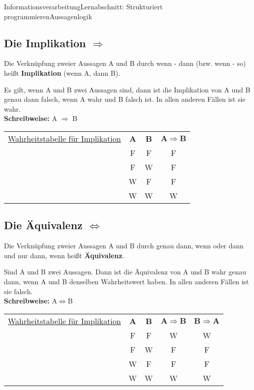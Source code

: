 \documentclass[11pt,oneside,openany,headings=optiontotoc,11pt,numbers=noenddot]{article}
\begin{document}
\begin{worksheet}{Informationsverarbeitung}{Lernabschnitt: Strukturiert programmieren}{Aussagenlogik}
		\subsection{Die Implikation \grqq{}$\Rightarrow$\grqq{}}
		Die Verknüpfung zweier Aussagen A und B durch \grqq{}wenn - dann\grqq{} (bzw. \grqq{}wenn - so\grqq{}) heißt \textbf{Implikation} (wenn A, dann B).
		\begin{framed}
			\noindent
			Es gilt, wenn A und B zwei Aussagen sind, dann ist die Implikation von A und B genau dann falsch, wenn A wahr und B falsch ist. In allen anderen Fällen ist sie wahr.\\
			\textbf{Schreibweise:} A $\Rightarrow$ B
		\end{framed}
		\par\noindent
		\begin{tabularx}{\textwidth}{l|c|c|c|}
			\cline{2-4}
			\underline{Wahrheitstabelle für Implikation} & \textbf{A} & \textbf{B} & \(\mathbf{A \Rightarrow{}B}\)\\
			\cline{2-4}
			& F & F & F\\
			\cline{2-4}
			& F & W & F\\
			\cline{2-4}
			& W & F & F\\
			\cline{2-4}
			& W & W & W\\
			\cline{2-4}
		\end{tabularx}
		\subsection{Die Äquivalenz \grqq{}$\Leftrightarrow$\grqq{}}
		Die Verknüpfung zweier Aussagen A und B durch \grqq{}genau dann, wenn\grqq{} oder \grqq{}dann und nur dann, wenn\grqq{} heißt \textbf{Äquivalenz}.
		\begin{framed}
			\noindent
			Sind A und B zwei Aussagen. Dann ist die Äquivalenz von A und B wahr genau dann, wenn A und B denselben Wahrheitswert haben. In allen anderen Fällen ist sie falsch.\\
			\textbf{Schreibweise:} A$\Leftrightarrow$B
		\end{framed}
		\par\noindent
		\begin{tabularx}{\textwidth}{l|c|c|c|c|}
			\cline{2-5}
			\underline{Wahrheitstabelle für Implikation} & \textbf{A} & \textbf{B} & \(\mathbf{A \Rightarrow{}B}\) & \(\mathbf{B \Rightarrow{}A}\)\\
			\cline{2-5}
			& F & F & W & W\\
			\cline{2-5}
			& F & W & F & F\\
			\cline{2-5}
			& W & F & F & F\\
			\cline{2-5}
			& W & W & W & W\\
			\cline{2-5}
		\end{tabularx}

\end{worksheet}
\end{document}
